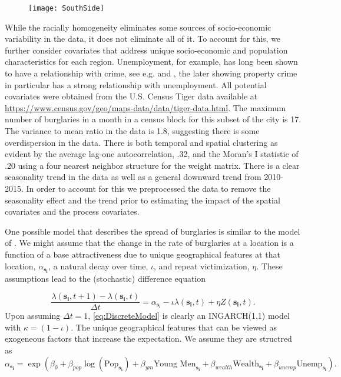 \documentclass[11pt]{isuthesis}
\begin{document}
\begin{figure}[!htp]
	\centering
	\texttt{[image: SouthSide]}
	\label{fig:SouthSide}
\end{figure}


While the racially homogeneity eliminates some sources of socio-economic variability in the data, it does not eliminate all of it.  To account for this, we further consider covariates that address unique socio-economic and population characteristics for each region. Unemployment, for example, has long been shown to have a relationship with crime, see e.g. \cite{britt1994crime} and \cite{raphael2001identifying}, the later showing property crime in particular has a strong relationship with unemployment.  All potential covariates were obtained from the U.S. Census Tiger data available at \href{https://www.census.gov/geo/maps-data/data/tiger-data.html}{https://www.census.gov/geo/maps-data/data/tiger-data.html}.  The maximum number of burglaries in a month in a census block for this subset of the city is 17.  The variance to mean ratio in the data is 1.8, suggesting there is some overdispersion in the data.  There is both temporal and spatial clustering as evident by the average lag-one autocorrelation, .32, and the Moran's I statistic of .20 using a four nearest neighbor structure for the weight matrix.  There is a clear seasonality trend in the data as well as a general downward trend from 2010-2015.  In order to account for this we preprocessed the data to remove the seasonality effect and the trend prior to estimating the impact of the spatial covariates and the process covariates.

One possible model that describes the spread of burglaries is similar to the model of \cite{short2008statistical}.  We might assume that the change in the rate of burglaries at a location is a function of a base attractiveness due to unique geographical features at that location, $\alpha_{\boldsymbol{s_i}}$, a natural decay over time, $\iota$, and repeat victimization, $\eta$.  These assumptions lead to the (stochastic) difference equation

\begin{equation}
	\frac{\lambda(\boldsymbol{s_i},t+1)-\lambda(\boldsymbol{s_i},t)}{\Delta t}=\alpha_{\boldsymbol{s_i}}-\iota \lambda(\boldsymbol{s_i},t)+\eta Z(\boldsymbol{s_i},t)\label{eq:DiscreteModel}.
\end{equation}
Upon assuming $\Delta t=1$, \eqref{eq:DiscreteModel} is clearly an INGARCH(1,1) model with $\kappa=(1-\iota)$.  The unique geographical features that can be viewed as exogeneous factors that increase the expectation.  We assume they are structred as
\begin{equation}
	\alpha_{\boldsymbol{s_i}}=\exp\left(\beta_0+\beta_{pop} \log(\mbox{Pop}_{\boldsymbol{s_i}})+\beta_{ym}\mbox{Young Men}_{\boldsymbol{s_i}}+\beta_{wealth}\mbox{Wealth}_{\boldsymbol{s_i}}+\beta_{unemp}\mbox{Unemp}_{\boldsymbol{s_i}}\right) \label{eq:mean strucutre}.
\end{equation}
\end{document}
